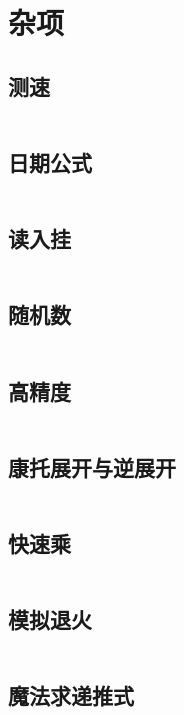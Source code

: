 \documentclass[UTF8]{ctexart}
\begin{document}
\section{杂项}
\subsection{测速}
\inputminted{cpp}{others/chrono.cpp}
\subsection{日期公式}
\inputminted{cpp}{others/date.cpp}
\subsection{读入挂}
\inputminted{cpp}{others/fread.cpp}
\subsection{随机数}
\inputminted{cpp}{others/随机数.cpp}
\subsection{高精度}
\inputminted{cpp}{others/高精度1.cpp}
\subsection{康托展开与逆展开}
\inputminted{cpp}{others/康托展开与康托逆展开.cpp}
\subsection{快速乘}
\inputminted{cpp}{others/快速乘.cpp}
\subsection{模拟退火}
\inputminted{cpp}{others/模拟退火.cpp}
\subsection{魔法求递推式}
\inputminted{cpp}{others/魔法求递推式.cpp}


\end{document}
